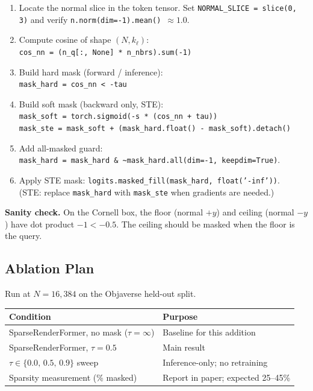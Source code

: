 \documentclass[11pt,letterpaper]{article}
\newcommand{\ours}{SparseRenderFormer}
\newcommand{\code}[1]{\texttt{#1}}
\begin{document}
\begin{enumerate}[nosep]
  \item Locate the normal slice in the token tensor.
    Set \code{NORMAL\_SLICE = slice(0, 3)} and verify
    \code{n.norm(dim=-1).mean()}~$\approx 1.0$.
  \item Compute cosine of shape $(N, k_\ell)$:\\
    \code{cos\_nn = (n\_q[:, None] * n\_nbrs).sum(-1)}
  \item Build hard mask (forward / inference):\\
    \code{mask\_hard = cos\_nn < -tau}
  \item Build soft mask (backward only, STE):\\
    \code{mask\_soft = torch.sigmoid(-s * (cos\_nn + tau))}\\
    \code{mask\_ste = mask\_soft + (mask\_hard.float() - mask\_soft).detach()}
  \item Add all-masked guard:\\
    \code{mask\_hard = mask\_hard \& \textasciitilde mask\_hard.all(dim=-1, keepdim=True)}.
  \item Apply STE mask: \code{logits.masked\_fill(mask\_hard, float('-inf'))}.\\
    (STE: replace \code{mask\_hard} with \code{mask\_ste} when gradients are needed.)
\end{enumerate}

\begin{actionbox}
\textbf{Sanity check.}
On the Cornell box, the floor (normal $+y$) and ceiling (normal $-y$)
have dot product $-1 < -0.5$.
The ceiling should be masked when the floor is the query.
\end{actionbox}

\subsection{Ablation Plan}

Run at $N = 16{,}384$ on the Objaverse held-out split.

\begin{center}\small
\begin{tabularx}{\textwidth}{@{}lX@{}}
\toprule
Condition & Purpose \\
\midrule
\ours, no mask ($\tau = \infty$) & Baseline for this addition \\
\ours, $\tau = 0.5$ & Main result \\
$\tau \in \{0.0,\,0.5,\,0.9\}$ sweep & Inference-only; no retraining \\
Sparsity measurement (\% masked) & Report in paper; expected 25--45\% \\
\bottomrule
\end{tabularx}
\end{center}
\end{document}

